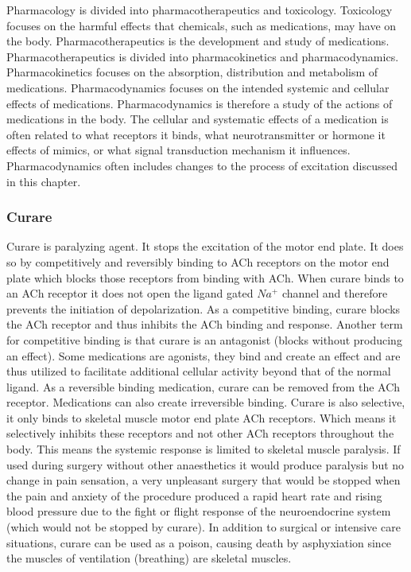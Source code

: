 Pharmacology is divided into pharmacotherapeutics and toxicology. Toxicology focuses on the harmful effects that chemicals, such as medications, may have on the body. Pharmacotherapeutics is the development and study of medications. Pharmacotherapeutics is divided into pharmacokinetics and pharmacodynamics. Pharmacokinetics focuses on the absorption, distribution and metabolism of medications. Pharmacodynamics focuses on the intended systemic and cellular effects of medications. Pharmacodynamics is therefore a study of the actions of medications in the body. The cellular and systematic effects of a medication is often related to what receptors it binds, what neurotransmitter or hormone it effects of mimics, or what signal transduction mechanism it influences. Pharmacodynamics often includes changes to the process of excitation discussed in this chapter.

\subsubsection{Curare}
Curare is paralyzing agent. It stops the excitation of the motor end plate. It does so by competitively and reversibly binding to ACh receptors on the motor end plate which blocks those receptors from binding with ACh. When curare binds to an ACh receptor it does not open the ligand gated $Na^+$ channel and therefore prevents the initiation of depolarization. As a competitive binding, curare blocks the ACh receptor and thus inhibits the ACh binding and response. Another term for competitive binding is that curare is an antagonist (blocks without producing an effect). Some medications are agonists, they bind and create an effect and are thus utilized to facilitate additional cellular activity beyond that of the normal ligand. As a reversible binding medication, curare can be removed from the ACh receptor. Medications can also create irreversible binding. Curare is also selective, it only binds to skeletal muscle motor end plate ACh receptors. Which means it selectively inhibits these receptors and not other ACh receptors throughout the body. This means the systemic response is limited to skeletal muscle paralysis. If used during surgery without other anaesthetics it would produce paralysis but no change in pain sensation, a very unpleasant surgery that would be stopped when the pain and anxiety of the procedure produced a rapid heart rate and rising blood pressure due to the fight or flight response of the neuroendocrine system (which would not be stopped by curare). In addition to surgical or intensive care situations, curare can be used as a poison, causing death by asphyxiation since the muscles of ventilation (breathing) are skeletal muscles. 

